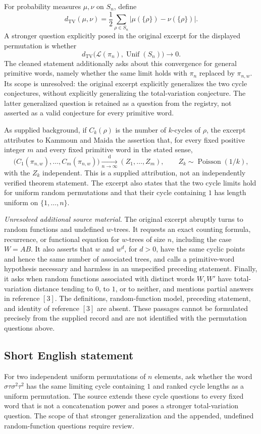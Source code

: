 \documentclass[11pt]{article}
\begin{document}
For probability measures \(\mu,\nu\) on \(S_n\), define
\[
d_{\mathrm{TV}}(\mu,\nu)=\frac12\sum_{\rho\in S_n}|\mu(\{\rho\})-\nu(\{\rho\})|.
\]
A stronger question explicitly posed in the original excerpt for the displayed permutation is whether
\[
d_{\mathrm{TV}}\bigl(\mathcal L(\pi_n),\operatorname{Unif}(S_n)\bigr)\longrightarrow0.
\]
The cleaned statement additionally asks about this convergence for general primitive words, namely whether the same limit holds with \(\pi_n\) replaced by \(\pi_{n,w}\). Its scope is unresolved: the original excerpt explicitly generalizes the two cycle conjectures, without explicitly generalizing the total-variation conjecture. The latter generalized question is retained as a question from the registry, not asserted as a valid conjecture for every primitive word.

As supplied background, if \(C_k(\rho)\) is the number of \(k\)-cycles of \(\rho\), the excerpt attributes to Kammoun and Maida the assertion that, for every fixed positive integer \(m\) and every fixed primitive word in the stated sense,
\[
\bigl(C_1(\pi_{n,w}),\ldots,C_m(\pi_{n,w})\bigr)
\xrightarrow[n\to\infty]{\mathrm d}(Z_1,\ldots,Z_m),
\qquad Z_k\sim\operatorname{Poisson}(1/k),
\]
with the \(Z_k\) independent. This is a supplied attribution, not an independently verified theorem statement. The excerpt also states that the two cycle limits hold for uniform random permutations and that their cycle containing \(1\) has length uniform on \(\{1,\ldots,n\}\).

\emph{Unresolved additional source material.} The original excerpt abruptly turns to random functions and undefined \(w\)-trees. It requests an exact counting formula, recurrence, or functional equation for \(w\)-trees of size \(n\), including the case \(W=AB\). It also asserts that \(w\) and \(w^d\), for \(d>0\), have the same cyclic points and hence the same number of associated trees, and calls a primitive-word hypothesis necessary and harmless in an unspecified preceding statement. Finally, it asks when random functions associated with distinct words \(W,W'\) have total-variation distance tending to \(0\), to \(1\), or to neither, and mentions partial answers in reference \([3]\). The definitions, random-function model, preceding statement, and identity of reference \([3]\) are absent. These passages cannot be formulated precisely from the supplied record and are not identified with the permutation questions above.
\subsection{Short English statement}
For two independent uniform permutations of \(n\) elements, ask whether the word \(\sigma\tau\sigma^2\tau^2\) has the same limiting cycle containing \(1\) and ranked cycle lengths as a uniform permutation. The source extends these cycle questions to every fixed word that is not a concatenation power and poses a stronger total-variation question. The scope of that stronger generalization and the appended, undefined random-function questions require review.
\end{document}
